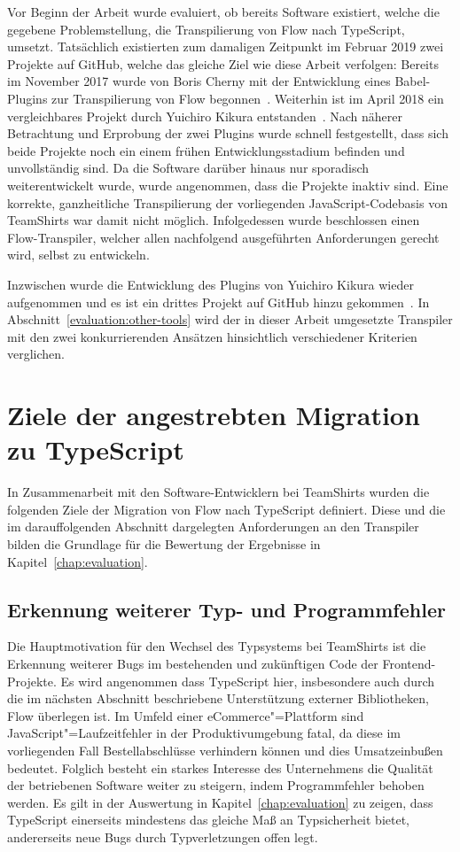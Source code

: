 Vor Beginn der Arbeit wurde evaluiert, ob bereits Software existiert, welche die gegebene Problemstellung, die Transpilierung von Flow nach TypeScript, umsetzt. Tatsächlich existierten zum damaligen Zeitpunkt im Februar 2019 zwei Projekte auf GitHub, welche das gleiche Ziel wie diese Arbeit verfolgen: Bereits im November 2017 wurde von Boris Cherny mit der Entwicklung eines Babel-Plugins zur Transpilierung von Flow begonnen~\autocite{CHERNY:FLOW_TO_TS}. Weiterhin ist im April 2018 ein vergleichbares Projekt durch Yuichiro Kikura entstanden~\autocite{KIKURA:FLOW_TO_TS}. Nach näherer Betrachtung und Erprobung der zwei Plugins wurde schnell festgestellt, dass sich beide Projekte noch ein einem frühen Entwicklungsstadium befinden und unvollständig sind. Da die Software darüber hinaus nur sporadisch weiterentwickelt wurde, wurde angenommen, dass die Projekte inaktiv sind. Eine korrekte, ganzheitliche Transpilierung der vorliegenden JavaScript-Codebasis von TeamShirts war damit nicht möglich. Infolgedessen wurde beschlossen einen Flow-Transpiler, welcher allen nachfolgend ausgeführten Anforderungen gerecht wird, selbst zu entwickeln.

Inzwischen wurde die Entwicklung des Plugins von Yuichiro Kikura wieder aufgenommen und es ist ein drittes Projekt auf GitHub hinzu gekommen~\autocite{KHAN:FLOW_TO_TS}. In Abschnitt~\ref{evaluation:other-tools} wird der in dieser Arbeit umgesetzte Transpiler mit den zwei konkurrierenden Ansätzen hinsichtlich verschiedener Kriterien verglichen.

\section{Ziele der angestrebten Migration zu TypeScript}
\label{analysis:goals}

In Zusammenarbeit mit den Software-Entwicklern bei TeamShirts wurden die folgenden Ziele der Migration von Flow nach TypeScript definiert. Diese und die im darauffolgenden Abschnitt dargelegten Anforderungen an den Transpiler bilden die Grundlage für die Bewertung der Ergebnisse in Kapitel~\ref{chap:evaluation}.

\subsection{Erkennung weiterer Typ- und Programmfehler}

Die Hauptmotivation für den Wechsel des Typsystems bei TeamShirts ist die Erkennung weiterer Bugs im bestehenden und zukünftigen Code der Frontend-Projekte. Es wird angenommen dass TypeScript hier, insbesondere auch durch die im nächsten Abschnitt beschriebene Unterstützung externer Bibliotheken, Flow überlegen ist. Im Umfeld einer eCommerce"=Plattform sind JavaScript"=Laufzeitfehler in der Produktivumgebung fatal, da diese im vorliegenden Fall Bestellabschlüsse verhindern können und dies Umsatzeinbußen bedeutet. Folglich besteht ein starkes Interesse des Unternehmens die Qualität der betriebenen Software weiter zu steigern, indem Programmfehler behoben werden. Es gilt in der Auswertung in Kapitel~\ref{chap:evaluation} zu zeigen, dass TypeScript einerseits mindestens das gleiche Maß an Typsicherheit bietet, andererseits neue Bugs durch Typverletzungen offen legt.

